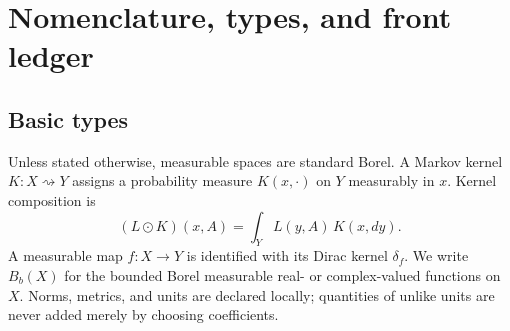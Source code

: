 \documentclass[11pt,a4paper]{article}
\theoremstyle{definition}
\theoremstyle{plain}
\theoremstyle{remark}
\begin{document}
\section{Nomenclature, types, and front ledger}\label{sec:nomenclature}

\subsection{Basic types}

Unless stated otherwise, measurable spaces are standard Borel.  A Markov
kernel \(K:X\rightsquigarrow Y\) assigns a probability measure
\(K(x,\cdot)\) on \(Y\) measurably in \(x\).  Kernel composition is
\[
 (L\odot K)(x,A)=\int_Y L(y,A)\,K(x,dy).
\]
A measurable map \(f:X\to Y\) is identified with its Dirac kernel
\(\delta_f\).  We write \(B_b(X)\) for the bounded Borel measurable
real- or complex-valued functions on \(X\).  Norms, metrics, and units are
declared locally; quantities of unlike units are never added merely by
choosing coefficients.
\end{document}
